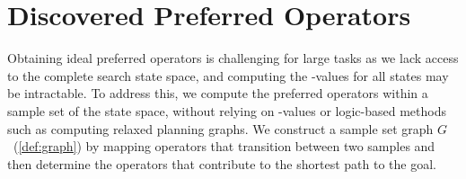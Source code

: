 \documentclass[ppgc,diss,english]{iiufrgs}
\begin{document}
%
%



\section{Discovered Preferred Operators}
\label{sec:sample-discovered-po}
Obtaining ideal preferred operators is challenging for large tasks as we lack access to the complete search state space, and computing the \hstar-values for all states may be intractable. To address this, we compute the preferred operators within a sample set of the state space, without relying on \hstar-values or logic-based methods such as computing relaxed planning graphs. We construct a sample set graph $G$~(\vref{def:graph}) by mapping operators that transition between two samples and then determine the operators that contribute to the shortest path to the goal.
\end{document}
